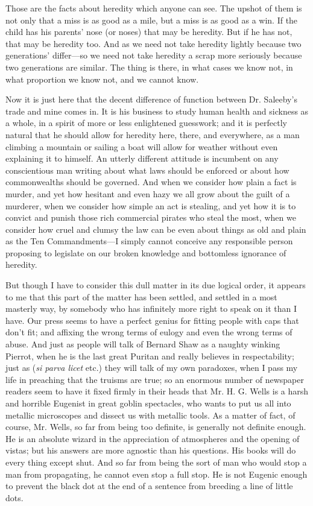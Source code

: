\documentclass{book}
\begin{document}
Those are the facts about heredity which anyone can see. The upshot of them is not only that a miss is as good as a mile, but a miss is as good as a win. If the child has his parents’ nose (or noses) that may be heredity. But if he has not, that may be heredity too. And as we need not take heredity lightly because two generations’ differ—so we need not take heredity a scrap more seriously because two generations are similar. The thing is there, in what cases we know not, in what proportion we know not, and we cannot know.

Now it is just here that the decent difference of function between Dr. Saleeby’s trade and mine comes in. It is his business to study human health and sickness as a whole, in a spirit of more or less enlightened guesswork; and it is perfectly natural that he should allow for heredity here, there, and everywhere, as a man climbing a mountain or sailing a boat will allow for weather without even explaining it to himself. An utterly different attitude is incumbent on any conscientious man writing about what laws should be enforced or about how commonwealths should be governed. And when we consider how plain a fact is murder, and yet how hesitant and even hazy we all grow about the guilt of a murderer, when we consider how simple an act is stealing, and yet how it is to convict and punish those rich commercial pirates who steal the most, when we consider how cruel and clumsy the law can be even about things as old and plain as the Ten Commandments—I simply cannot conceive any responsible person proposing to legislate on our broken knowledge and bottomless ignorance of heredity.

But though I have to consider this dull matter in its due logical order, it appears to me that this part of the matter has been settled, and settled in a most masterly way, by somebody who has infinitely more right to speak on it than I have. Our press seems to have a perfect genius for fitting people with caps that don’t fit; and affixing the wrong terms of eulogy and even the wrong terms of abuse. And just as people will talk of Bernard Shaw as a naughty winking Pierrot, when he is the last great Puritan and really believes in respectability; just as (\emph{si parva licet} etc.) they will talk of my own paradoxes, when I pass my life in preaching that the truisms are true; so an enormous number of newspaper readers seem to have it fixed firmly in their heads that Mr. H. G. Wells is a harsh and horrible Eugenist in great goblin spectacles, who wants to put us all into metallic microscopes and dissect us with metallic tools. As a matter of fact, of course, Mr. Wells, so far from being too definite, is generally not definite enough. He is an absolute wizard in the appreciation of atmospheres and the opening of vistas; but his answers are more agnostic than his questions. His books will do every thing except shut. And so far from being the sort of man who would stop a man from propagating, he cannot even stop a full stop. He is not Eugenic enough to prevent the black dot at the end of a sentence from breeding a line of little dots.
\end{document}
